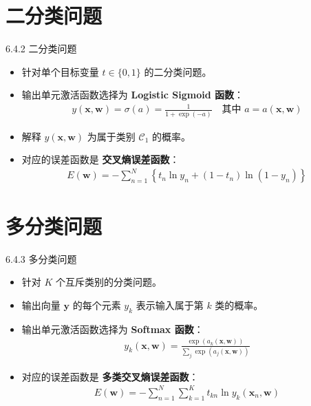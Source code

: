 \documentclass[t,aspectratio=169]{beamer} %
\begin{document}
\section{二分类问题}
\begin{frame}{6.4.2 二分类问题}
    \begin{itemize}
        \item 针对单个目标变量 $t \in \{0, 1\}$ 的二分类问题。
        \item 输出单元激活函数选择为 \textbf{Logistic Sigmoid 函数}：
        \begin{align}
            y(\mathbf{x}, \mathbf{w}) = \sigma(a) = \frac{1}{1+\exp(-a)} \quad \text{其中 } a = a(\mathbf{x}, \mathbf{w})
        \end{align}
        \item 解释 $y(\mathbf{x}, \mathbf{w})$ 为属于类别 $\mathcal{C}_1$ 的概率。
        \item 对应的误差函数是 \textbf{交叉熵误差函数}：
        \begin{align}
            E(\mathbf{w}) = -\sum_{n=1}^N \left\{ t_n \ln y_n + (1 - t_n) \ln (1 - y_n) \right\} %
        \end{align}
    \end{itemize}
\end{frame}

\section{多分类问题}
\begin{frame}{6.4.3 多分类问题}
    \begin{itemize}
        \item 针对 $K$ 个互斥类别的分类问题。
        \item 输出向量 $\mathbf{y}$ 的每个元素 $y_k$ 表示输入属于第 $k$ 类的概率。
        \item 输出单元激活函数选择为 \textbf{Softmax 函数}：
        \begin{align}
            y_k(\mathbf{x}, \mathbf{w}) = \frac{\exp(a_k(\mathbf{x}, \mathbf{w}))}{\sum_j \exp(a_j(\mathbf{x}, \mathbf{w}))} %
        \end{align}
        \item 对应的误差函数是 \textbf{多类交叉熵误差函数}：
        \begin{align}
            E(\mathbf{w}) = -\sum_{n=1}^N \sum_{k=1}^K t_{kn} \ln y_k(\mathbf{x}_n, \mathbf{w}) %
        \end{align}
    \end{itemize}
\end{frame}
\end{document}
